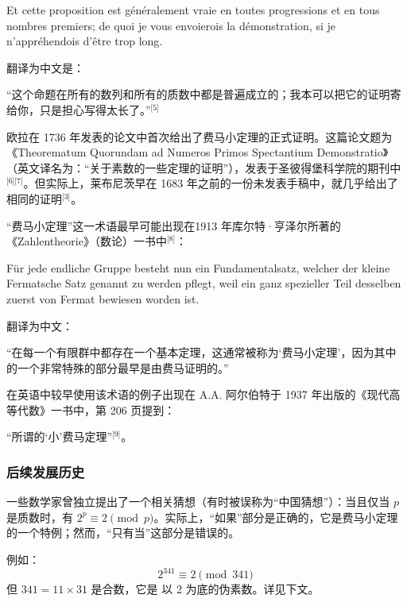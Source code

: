 Et cette proposition est généralement vraie en toutes progressions et en tous nombres premiers; de quoi je vous envoierois la démonstration, si je n'appréhendois d'être trop long.

翻译为中文是：

“这个命题在所有的数列和所有的质数中都是普遍成立的；我本可以把它的证明寄给你，只是担心写得太长了。”\(^\text{[5]}\)

欧拉在 1736 年发表的论文中首次给出了费马小定理的正式证明。这篇论文题为 《Theorematum Quorundam ad Numeros Primos Spectantium Demonstratio》（英文译名为：“关于素数的一些定理的证明”），发表于圣彼得堡科学院的期刊中\(^\text{[6][7]}\)。但实际上，莱布尼茨早在 1683 年之前的一份未发表手稿中，就几乎给出了相同的证明\(^\text{[3]}\)。

“费马小定理”这一术语最早可能出现在1913 年库尔特·亨泽尔所著的《Zahlentheorie》（数论）一书中\(^\text{[8]}\)：

Für jede endliche Gruppe besteht nun ein Fundamentalsatz, welcher der kleine Fermatsche Satz genannt zu werden pflegt, weil ein ganz spezieller Teil desselben zuerst von Fermat bewiesen worden ist.

翻译为中文：

“在每一个有限群中都存在一个基本定理，这通常被称为‘费马小定理’，因为其中的一个非常特殊的部分最早是由费马证明的。”

在英语中较早使用该术语的例子出现在 A.A. 阿尔伯特于 1937 年出版的《现代高等代数》一书中，第 206 页提到：

“所谓的‘小’费马定理”\(^\text{[9]}\)。
\subsubsection{后续发展历史}
一些数学家曾独立提出了一个相关猜想（有时被误称为“中国猜想”）：当且仅当 $p$ 是质数时，有 $2^p \equiv 2 \pmod{p}$。实际上，“如果”部分是正确的，它是费马小定理的一个特例；然而，“只有当”这部分是错误的。

例如：
$$
2^{341} \equiv 2 \pmod{341}~
$$
但 $341 = 11 \times 31$ 是合数，它是 以 2 为底的伪素数。详见下文。


